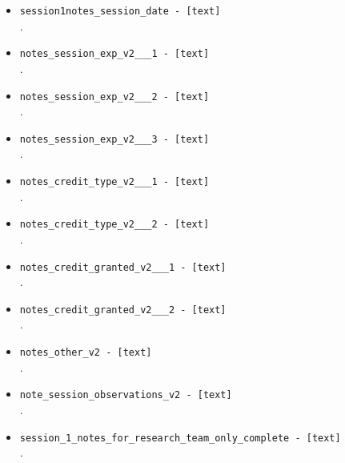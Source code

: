 \begin{description}
\begin{addmargin}[0em]{0em}
\begin{addmargin}[1em]{0em}
\begin{itemize}
            \item \verb|session1notes_session_date - [text]|\\.
            \item \verb|notes_session_exp_v2___1 - [text]|\\.
            \item \verb|notes_session_exp_v2___2 - [text]|\\.
            \item \verb|notes_session_exp_v2___3 - [text]|\\.
            \item \verb|notes_credit_type_v2___1 - [text]|\\.
            \item \verb|notes_credit_type_v2___2 - [text]|\\.
            \item \verb|notes_credit_granted_v2___1 - [text]|\\.
            \item \verb|notes_credit_granted_v2___2 - [text]|\\.
            \item \verb|notes_other_v2 - [text]|\\.
            \item \verb|note_session_observations_v2 - [text]|\\.
            \item \verb|session_1_notes_for_research_team_only_complete - [text]|\\.
        \end{itemize}
    \end{addmargin} %



\end{addmargin}
\end{description}
